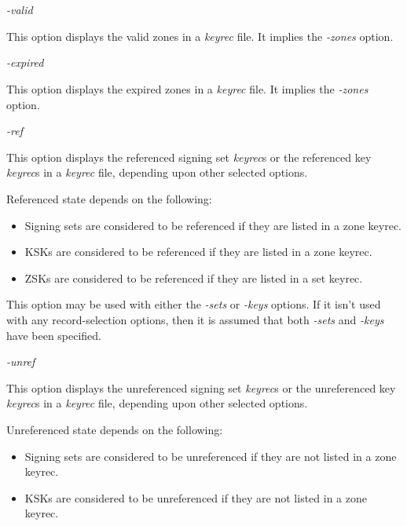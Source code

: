 \begin{description}

\item {\it -valid}\verb" "

This option displays the valid zones in a {\it keyrec} file.
It implies the {\it -zones} option.

\item {\it -expired}\verb" "

This option displays the expired zones in a {\it keyrec} file.
It implies the {\it -zones} option.

\item {\it -ref}\verb" "

This option displays the referenced signing set {\it keyrec}s or the
referenced key {\it keyrec}s in a {\it keyrec} file, depending upon other
selected options.

Referenced state depends on the following:

\begin{itemize}
\item Signing sets are considered to be referenced if they are listed in a
zone keyrec.

\item KSKs are considered to be referenced if they are listed in a zone
keyrec.

\item ZSKs are considered to be referenced if they are listed in a set keyrec.

\end{itemize}

This option may be used with either the {\it -sets} or {\it -keys} options.
If it isn't used with any record-selection options, then it is assumed that
both {\it -sets} and {\it -keys} have been specified.

\item {\it -unref}\verb" "

This option displays the unreferenced signing set {\it keyrec}s or the
unreferenced key {\it keyrec}s in a {\it keyrec} file, depending upon other
selected options.

Unreferenced state depends on the following:

\begin{itemize}
\item Signing sets are considered to be unreferenced if they are not listed in
a zone keyrec.

\item KSKs are considered to be unreferenced if they are not listed in a zone
keyrec.


\end{itemize}
\end{description}
